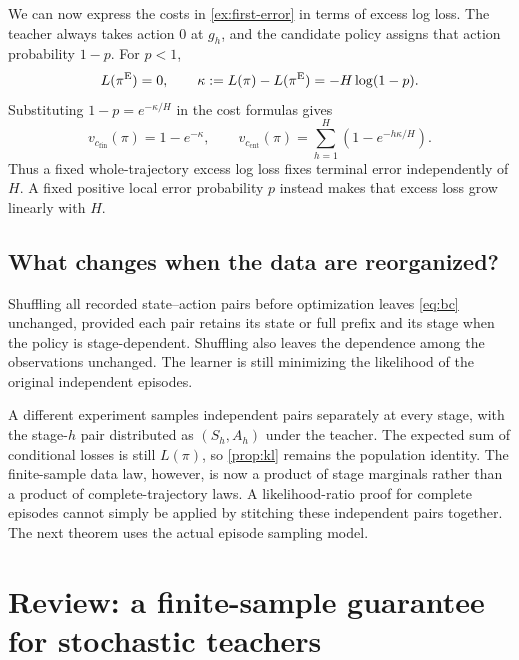 \documentclass[11pt,twoside]{article}
\theoremstyle{definition}
\theoremstyle{remark}
\begin{document}
We can now express the costs in \cref{ex:first-error} in terms of excess
log loss. The teacher always takes action $0$ at $g_h$, and the candidate
policy assigns that action probability $1-p$. For $p<1$,
\[
 L(\pi^{\rm E})=0,\qquad
 \kappa:=L(\pi)-L(\pi^{\rm E})=-H\log(1-p).
\]
Substituting $1-p=e^{-\kappa/H}$ in the cost formulas gives
\[
 v_{c_{\mathrm{fin}}}(\pi)=1-e^{-\kappa},\qquad
 v_{c_{\mathrm{cnt}}}(\pi)=\sum_{h=1}^H(1-e^{-h\kappa/H}).
\]
Thus a fixed whole-trajectory excess log loss fixes terminal error
independently of $H$. A fixed positive local error probability $p$ instead makes
that excess loss grow linearly with $H$.

\subsection{What changes when the data are reorganized?}

Shuffling all recorded state--action pairs before optimization leaves
\cref{eq:bc} unchanged, provided each pair retains its state or full prefix
and its stage when the policy is stage-dependent. Shuffling also leaves
the dependence among the observations unchanged. The learner is still
minimizing the likelihood of the original independent episodes.

A different experiment samples independent pairs separately at every stage,
with the stage-$h$ pair distributed as $(S_h,A_h)$ under the teacher.
The expected sum of conditional losses is still $L(\pi)$, so
\cref{prop:kl} remains the population identity. The finite-sample data law,
however, is now a product of stage marginals rather than a product of
complete-trajectory laws. A likelihood-ratio proof for complete episodes
cannot simply be applied by stitching these independent pairs together.
The next theorem uses the actual episode sampling model.

\section{Review: a finite-sample guarantee for stochastic teachers}
\label{sec:finite}
\end{document}
